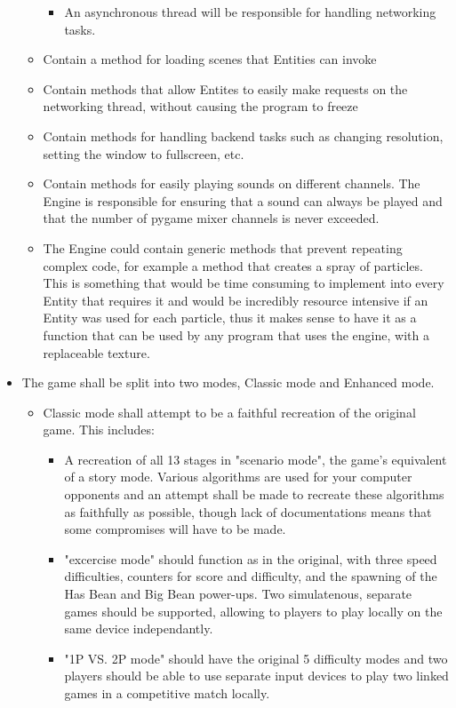\documentclass{article}
\begin{document}
\begin{itemize}
\begin{itemize}
\begin{itemize}
                \item An asynchronous thread will be responsible for handling networking tasks.
            \end{itemize}
        \item Contain a method for loading scenes that Entities can invoke
        \item Contain methods that allow Entites to easily make requests on the networking thread, without causing the program to freeze
        \item Contain methods for handling backend tasks such as changing resolution, setting the window to fullscreen, etc.
        \item Contain methods for easily playing sounds on different channels. The Engine is responsible for ensuring that a sound can always be played and that the number of pygame mixer channels is never exceeded.
        \item The Engine could contain generic methods that prevent repeating complex code, for example a method that creates a spray of particles. This is something that would be time consuming to implement into every Entity that requires it and would be incredibly resource intensive if an Entity was used for each particle, thus it makes sense to have it as a function that can be used by any program that uses the engine, with a replaceable texture.
    \end{itemize}
    \item The game shall be split into two modes, Classic mode and Enhanced mode.
    \begin{itemize}
        \item Classic mode shall attempt to be a faithful recreation of the original game. This includes:
        \begin{itemize}
            \item A recreation of all 13 stages in "scenario mode", the game's equivalent of a story mode. Various algorithms are used for your computer opponents and an attempt shall be made to recreate these algorithms as faithfully as possible, though lack of documentations means that some compromises will have to be made.
            \item "excercise mode" should function as in the original, with three speed difficulties, counters for score and difficulty, and the spawning of the Has Bean and Big Bean power-ups. Two simulatenous, separate games should be supported, allowing to players to play locally on the same device independantly.
            \item "1P VS. 2P mode" should have the original 5 difficulty modes and two players should be able to use separate input devices to play two linked games in a competitive match locally.

\end{itemize}
\end{itemize}
\end{itemize}
\end{document}
